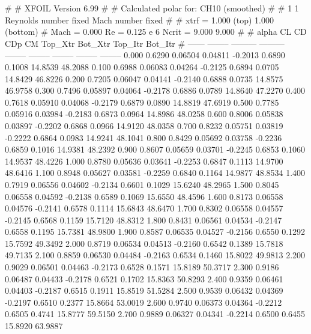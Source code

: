 #  
#       XFOIL         Version 6.99
#  
# Calculated polar for: CH10 (smoothed)                                 
#  
# 1 1 Reynolds number fixed          Mach number fixed         
#  
# xtrf =   1.000 (top)        1.000 (bottom)  
# Mach =   0.000     Re =     0.125 e 6     Ncrit =   9.000  9.000
#  
#   alpha    CL        CD       CDp       CM     Top_Xtr  Bot_Xtr  Top_Itr  Bot_Itr
#  ------ -------- --------- --------- -------- -------- -------- -------- --------
   0.000   0.6290   0.06504   0.04811  -0.2013   0.6890   0.1008  14.8539  48.2088
   0.100   0.6988   0.06083   0.04264  -0.2125   0.6894   0.0705  14.8429  46.8226
   0.200   0.7205   0.06047   0.04141  -0.2140   0.6888   0.0735  14.8575  46.9758
   0.300   0.7496   0.05897   0.04064  -0.2178   0.6886   0.0789  14.8640  47.2270
   0.400   0.7618   0.05910   0.04068  -0.2179   0.6879   0.0890  14.8819  47.6919
   0.500   0.7785   0.05916   0.03984  -0.2183   0.6873   0.0964  14.8986  48.0258
   0.600   0.8006   0.05838   0.03897  -0.2202   0.6868   0.0966  14.9120  48.0358
   0.700   0.8232   0.05751   0.03819  -0.2222   0.6864   0.0983  14.9241  48.1041
   0.800   0.8429   0.05692   0.03758  -0.2236   0.6859   0.1016  14.9381  48.2392
   0.900   0.8607   0.05659   0.03701  -0.2245   0.6853   0.1060  14.9537  48.4226
   1.000   0.8780   0.05636   0.03641  -0.2253   0.6847   0.1113  14.9700  48.6416
   1.100   0.8948   0.05627   0.03581  -0.2259   0.6840   0.1164  14.9877  48.8534
   1.400   0.7919   0.06556   0.04602  -0.2134   0.6601   0.1029  15.6240  48.2965
   1.500   0.8045   0.06558   0.04592  -0.2138   0.6589   0.1069  15.6550  48.4596
   1.600   0.8173   0.06558   0.04576  -0.2141   0.6578   0.1114  15.6843  48.6470
   1.700   0.8302   0.06558   0.04557  -0.2145   0.6568   0.1159  15.7120  48.8312
   1.800   0.8431   0.06561   0.04534  -0.2147   0.6558   0.1195  15.7381  48.9800
   1.900   0.8587   0.06535   0.04527  -0.2156   0.6550   0.1292  15.7592  49.3492
   2.000   0.8719   0.06534   0.04513  -0.2160   0.6542   0.1389  15.7818  49.7135
   2.100   0.8859   0.06530   0.04484  -0.2163   0.6534   0.1460  15.8022  49.9813
   2.200   0.9029   0.06501   0.04463  -0.2173   0.6528   0.1571  15.8189  50.3717
   2.300   0.9186   0.06487   0.04433  -0.2178   0.6521   0.1702  15.8363  50.8293
   2.400   0.9359   0.06461   0.04403  -0.2187   0.6515   0.1911  15.8519  51.5284
   2.500   0.9539   0.06432   0.04369  -0.2197   0.6510   0.2377  15.8664  53.0019
   2.600   0.9740   0.06373   0.04364  -0.2212   0.6505   0.4741  15.8777  59.5150
   2.700   0.9889   0.06327   0.04341  -0.2214   0.6500   0.6455  15.8920  63.9887
